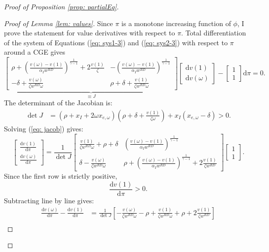 \begin{proof}[Proof of Proposition \ref{prop: partialEq}]
\begin{proof}[Proof of Lemma \ref{lem: values}]
Since $\pi$ is a monotone increasing function of $\phi$, I prove
the statement for value derivatives with respect to $\pi$. Total
differentiation of the system of Equations (\ref{eq: sys1-3}) and
(\ref{eq: sys2-3}) with respect to $\pi$ around a CGE gives
\begin{equation}
\underset{\equiv J}{\underbrace{\left[\begin{matrix}\rho+\left(\frac{v(\omega)-v(1)}{\alpha_{I}w^{RD}}\right)^{\frac{1}{\gamma-1}}+2\frac{v(1)}{\zeta} & -\left(\frac{v(\omega)-v(1)}{\alpha_{I}w^{RD}}\right)^{\frac{1}{\gamma-1}}\\
-\delta+\frac{v(\omega)}{\zeta w^{RD}\omega} & \rho+\delta+\frac{v(1)}{\zeta w^{RD}\omega}
\end{matrix}\right]}}\left[\begin{matrix}\mathrm{d}v(1)\\
\mathrm{d}v(\omega)
\end{matrix}\right]-\left[\begin{matrix}1\\
1
\end{matrix}\right]\mathrm{d}\pi=0.\label{eq: jacob}
\end{equation}
The determinant of the Jacobian is:
\begin{align*}
\det J & =\left(\rho+x_{I}+2\omega x_{e,\omega}\right)\left(\rho+\delta+\frac{v(1)}{\zeta\omega}\right)+x_{I}\left(x_{e,\omega}-\delta\right)>0.
\end{align*}
 Solving (\ref{eq: jacob}) gives:
\[
\left[\begin{matrix}\frac{\mathrm{d}v(1)}{\mathrm{d}\pi}\\
\frac{\mathrm{d}v(\omega)}{\mathrm{d}\pi}
\end{matrix}\right]=\frac{1}{\det J}\left[\begin{matrix}\frac{v(1)}{\zeta w^{RD}\omega}+\rho+\delta & \left(\frac{v(\omega)-v(1)}{\alpha_{I}w^{RD}}\right)^{\frac{1}{\gamma-1}}\\
\delta-\frac{v(\omega)}{\zeta w^{RD}\omega} & \rho+\left(\frac{v(\omega)-v(1)}{\alpha_{I}w^{RD}}\right)^{\frac{1}{\gamma-1}}+2\frac{v(1)}{\zeta w^{RD}}
\end{matrix}\right]\left[\begin{matrix}1\\
1
\end{matrix}\right].
\]
Since the first row is strictly positive, 
\[
\frac{\mathrm{d}v(1)}{\mathrm{d}\pi}>0.
\]
Subtracting line by line gives:
\begin{align}
\frac{\mathrm{d}v(\omega)}{\mathrm{d}\pi}-\frac{\mathrm{d}v(1)}{\mathrm{d}\pi} & =\frac{1}{\det J}\left[-\frac{v(\omega)}{\zeta w^{RD}\omega}-\rho+\frac{v(1)}{\zeta w^{RD}\omega}+\rho+2\frac{v(1)}{\zeta w^{RD}}\right]\nonumber \\

\end{align}
\end{proof}
\end{proof}
